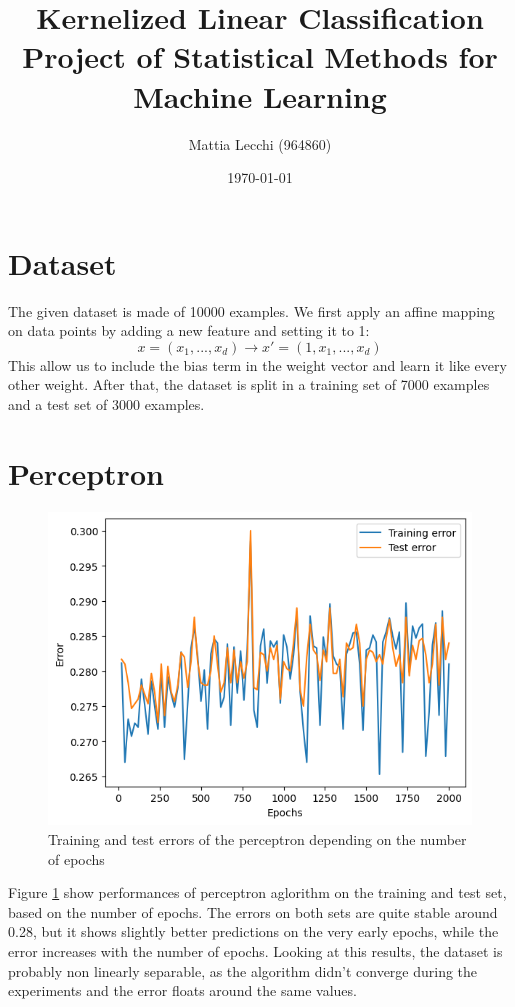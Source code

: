 \documentclass{article}
\author{Mattia Lecchi (964860)}
\date{\today}
\title{Kernelized Linear Classification \\ 
	\large Project of Statistical Methods for Machine Learning}
\begin{document}
\maketitle

\section{Dataset}
The given dataset is made of 10000 examples. We first apply an affine mapping on data points by adding a new feature and setting it to 1:
\begin{equation}
	x = (x_1, ..., x_d) \rightarrow x'=(1, x_1, ..., x_d)
\end{equation}
This allow us to include the bias term in the weight vector and learn it like every other weight. After that, the dataset is split in a training set of 7000 examples and a test set of 3000 examples.

\section{Perceptron}

\begin{figure}
	\centering
	\includegraphics[width=0.8\columnwidth]{../plots/perceptron.png}
	\caption{Training and test errors of the perceptron depending on the number of epochs}
	\label{fig:perceptron}
\end{figure}

Figure \ref{fig:perceptron} show performances of perceptron aglorithm on the training and test set, based on the number of epochs. The errors on both sets are quite stable around 0.28, but it shows slightly better predictions on the very early epochs, while the error increases with the number of epochs. Looking at this results, the dataset is probably non linearly separable, as the algorithm didn't converge during the experiments and the error floats around the same values.
\end{document}
